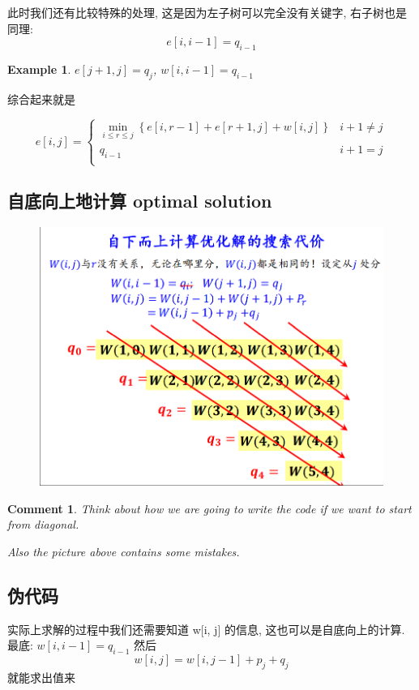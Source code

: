 \documentclass[a4paper, 10pt]{ctexart} %
\newtheorem{example}{Example}
\newtheorem{corollary}{Comment}
\begin{document}
此时我们还有比较特殊的处理, 这是因为左子树可以完全没有关键字, 右子树也是同理:
\[
e \left[ i, i -1 \right]= q _{i-1}
\]
\begin{example}
    $e\left[ j+1,j \right] = q_{j}$, $w [ i, i-1] = q_{i-1}$ 
\end{example}

综合起来就是

\[
e \left[ i , j  \right] =
\begin{cases}
    \min _{i \le r \le j} \left\{e \left[  i ,r -1  \right]+ e \left[ r+1 , j \right] + w[i,j]\right\} & i +1 \ne j\\
    q_{i-1} & i +1 = j\\ 
\end{cases}
\]

\subsection{自底向上地计算 optimal solution}
\begin{figure}[H]
    \centering
    \includegraphics[scale = 0.5]{dp1.png}
\end{figure}
\begin{corollary}
    Think about how we are going to 
    write the code if 
    we want to start from diagonal.

    Also the picture above contains some mistakes.
\end{corollary}

\subsection{伪代码}
实际上求解的过程中我们还需要知道 w[i, j] 的信息, 这也可以是自底向上的计算. 
最底: $w[i, i-1] = q_{i-1    }$ 
然后
\[
w\left[ i, j \right] = w\left[ i , j-1 \right] + p_j + q_j
\]
就能求出值来
\end{document}
